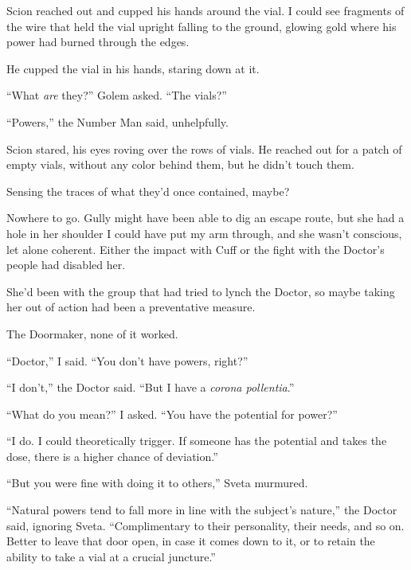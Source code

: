Scion reached out and cupped his hands around the vial.  I could see fragments of the wire that held the vial upright falling to the ground, glowing gold where his power had burned through the edges.



He cupped the vial in his hands, staring down at it.



``What \emph{are} they?'' Golem asked.  ``The vials?''



``Powers,'' the Number Man said, unhelpfully.



Scion stared, his eyes roving over the rows of vials.  He reached out for a patch of empty vials, without any color behind them, but he didn't touch them.



Sensing the traces of what they'd once contained, maybe?



Nowhere to go.  Gully might have been able to dig an escape route, but she had a hole in her shoulder I could have put my arm through, and she wasn't conscious, let alone coherent.  Either the impact with Cuff or the fight with the Doctor's people had disabled her.



She'd been with the group that had tried to lynch the Doctor, so maybe taking her out of action had been a preventative measure.



The Doormaker, none of it worked.



``Doctor,'' I said.  ``You don't have powers, right?''



``I don't,'' the Doctor said.  ``But I have a \emph{corona pollentia}.''



``What do you mean?'' I asked.  ``You have the potential for power?''



``I do.  I could theoretically trigger.  If someone has the potential and takes the dose, there is a higher chance of deviation.''



``But you were fine with doing it to others,'' Sveta murmured.



``Natural powers tend to fall more in line with the subject's nature,'' the Doctor said, ignoring Sveta.  ``Complimentary to their personality, their needs, and so on.  Better to leave that door open, in case it comes down to it, or to retain the ability to take a vial at a crucial juncture.''



